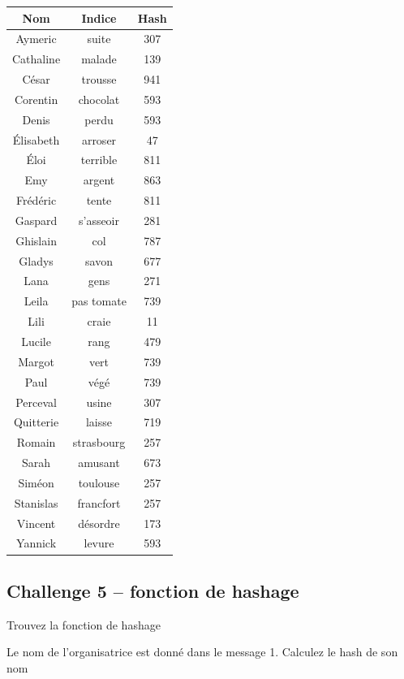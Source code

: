 \documentclass{article}
\begin{document}
	\begin{table}[H]
		\centering
		\begin{tabular}{|c|c|c|}
			\hline
			Nom & Indice & Hash \\
			\hline
			Aymeric & suite & 307 \\
			Cathaline & malade & 139 \\
			César & trousse & 941 \\
			Corentin & chocolat & 593 \\
			Denis & perdu & 593 \\
			Élisabeth & arroser & 47 \\
			Éloi & terrible & 811 \\
			Emy & argent & 863 \\
			Frédéric & tente & 811 \\
			Gaspard & s’asseoir & 281 \\
			Ghislain & col & 787 \\
			Gladys & savon & 677 \\
			Lana & gens & 271 \\
			Leila & pas tomate & 739 \\
			Lili & craie & 11 \\
			Lucile & rang & 479 \\
			Margot & vert & 739 \\
			Paul & végé & 739 \\
			Perceval & usine & 307 \\
			Quitterie & laisse & 719 \\
			Romain & strasbourg & 257 \\
			Sarah & amusant & 673 \\
			Siméon & toulouse & 257 \\
			Stanislas & francfort & 257 \\
			Vincent & désordre & 173 \\
			Yannick & levure & 593 \\
			\hline
		\end{tabular}
	\end{table}
	
	\subsection*{Challenge 5 – fonction de hashage}
	
	Trouvez la fonction de hashage
	
	Le nom de l’organisatrice est donné dans le message 1. Calculez le hash de son nom
	
\end{document}
